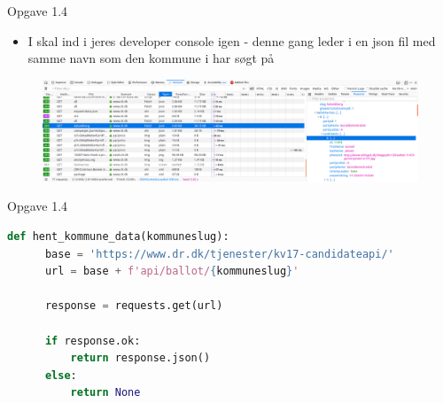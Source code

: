 \documentclass[10pt]{beamer}
\begin{document}
\begin{frame}[fragile]{Opgave 1.4}
  \begin{itemize}
    \item I skal ind i jeres developer console igen - denne gang leder i en json fil med samme navn som den kommune i har søgt på
  \end{itemize}
  \begin{figure}
    \centering
    \includegraphics[width=\textwidth]{figs/console.png}
  \end{figure}
\end{frame}

\begin{frame}[fragile]{Opgave 1.4}
  \begin{lstlisting}[language=python]
  def hent_kommune_data(kommuneslug):
      base = 'https://www.dr.dk/tjenester/kv17-candidateapi/'
      url = base + f'api/ballot/{kommuneslug}'

      response = requests.get(url)

      if response.ok:
          return response.json()
      else:
          return None
  \end{lstlisting}
\end{frame}
\end{document}
